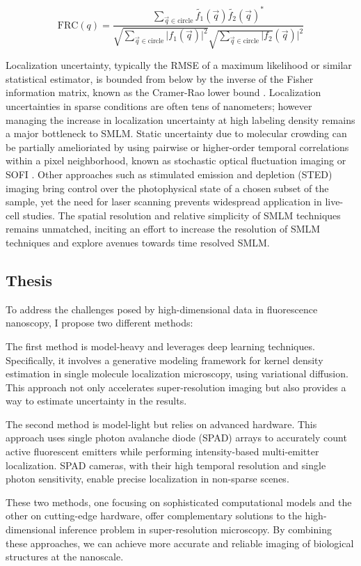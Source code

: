 \begin{equation*}
\mathrm{FRC}(q) = \frac{\sum_{\vec{q}\in\mathrm{circle}}\tilde{f_{1}}(\vec{q})\tilde{f_{2}}(\vec{q})^{*}}{\sqrt{\sum_{\vec{q}\in\mathrm{circle}}\lvert f_{1}(\vec{q})\lvert^{2}}\sqrt{\sum_{\vec{q}\in\mathrm{circle}}\lvert f_{2}}(\vec{q})\lvert^{2}}
\end{equation*}


Localization uncertainty, typically the RMSE of a maximum likelihood or similar statistical estimator, is bounded from below by the inverse of the Fisher information matrix, known as the Cramer-Rao lower bound \parencite{Chao2016}. Localization uncertainties in sparse conditions are often tens of nanometers; however managing the increase in localization uncertainty at high labeling density remains a major bottleneck to SMLM. Static uncertainty due to molecular crowding can be partially amelioriated by using pairwise or higher-order temporal correlations within a pixel neighborhood, known as stochastic optical fluctuation imaging or SOFI \parencite{Dertinger2009}. Other approaches such as stimulated emission and depletion (STED) imaging bring control over the photophysical state of a chosen subset of the sample, yet the need for laser scanning prevents widespread application in live-cell studies. The spatial resolution and relative simplicity of SMLM techniques remains unmatched, inciting an effort to increase the resolution of SMLM techniques and explore avenues towards time resolved SMLM.

\subsection{Thesis}

To address the challenges posed by high-dimensional data in fluorescence nanoscopy, I propose two different methods:

The first method is model-heavy and leverages deep learning techniques. Specifically, it involves a generative modeling framework for kernel density estimation in single molecule localization microscopy, using variational diffusion. This approach not only accelerates super-resolution imaging but also provides a way to estimate uncertainty in the results.

The second method is model-light but relies on advanced hardware. This approach uses single photon avalanche diode (SPAD) arrays to accurately count active fluorescent emitters while performing intensity-based multi-emitter localization. SPAD cameras, with their high temporal resolution and single photon sensitivity, enable precise localization in non-sparse scenes.

These two methods, one focusing on sophisticated computational models and the other on cutting-edge hardware, offer complementary solutions to the high-dimensional inference problem in super-resolution microscopy. By combining these approaches, we can achieve more accurate and reliable imaging of biological structures at the nanoscale.


